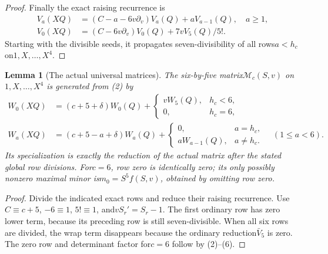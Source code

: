 \documentclass[11pt]{article}
\newtheorem{lemma}{Lemma}\newtheorem{theorem}[lemma]{Theorem}
\begin{document}
\begin{proof}
Finally the exact raising recurrence is
\[
\begin{aligned}
 V_a(XQ)&=(C-a-6v\partial_v)V_a(Q)+aV_{a-1}(Q),\quad a\ge1,\\
 V_0(XQ)&=(C-6v\partial_v)V_0(Q)+7vV_5(Q)/5!.
\end{aligned}
\]
Starting with the divisible seeds, it propagates seven-divisibility
of all rows$a<h_c$ on$1,X,\ldots,X^4$.
\end{proof}

\begin{lemma}[The actual universal matrices]\label{lem:matrices}
The six-by-five matrix$\mathcal M_c(S,v)$ on$1,X,\ldots,X^4$
is generated from (2) by
\[
\begin{aligned}
 W_0(XQ)&=(c+5+\delta)W_0(Q)
                   +\begin{cases}vW_5(Q),&h_c<6,\\0,&h_c=6,\end{cases}\\
 W_a(XQ)&=(c+5-a+\delta)W_a(Q)
                   +\begin{cases}0,&a=h_c,\\aW_{a-1}(Q),&a\ne h_c.\end{cases}
                                                       \quad(1\le a<6).
\end{aligned}                                                 \tag{6}
\]
Its specialization is exactly the reduction of the actual matrix
after the stated global row divisions.
For$c=6$, row zero is identically zero; its only possibly nonzero
maximal minor is$m_0=S^5 f(S,v)$, obtained by omitting row zero.
\end{lemma}
\begin{proof}
Divide the indicated exact rows and reduce their raising recurrence.
Use$C\equiv c+5$, $-6\equiv1$, $5!\equiv1$, and$vS_r'=S_r-1$.
The first ordinary row has zero lower term, because its preceding
row is still seven-divisible.
When all six rows are divided, the wrap term disappears because
the ordinary reduction$\bar V_5$ is zero.
The zero row and determinant factor for$c=6$ follow by (2)--(6).
\end{proof}
\end{document}
